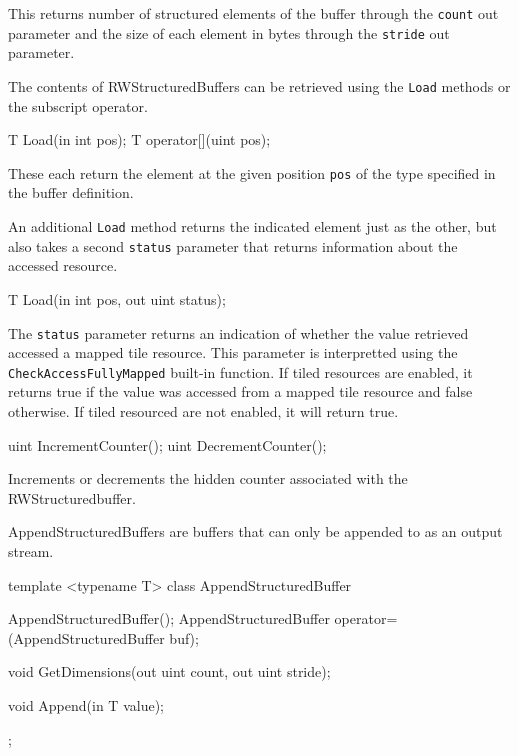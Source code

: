 This returns number of structured elements of the buffer through the \texttt{count} out parameter
and the size of each element in bytes through the \texttt{stride} out parameter.


The contents of RWStructuredBuffers can be retrieved using the \texttt{Load} methods
or the subscript operator.

\begin{HLSL}
 T Load(in int pos);
 T operator[](uint pos);
\end{HLSL}

These each return the element at the given position \texttt{pos} of the type specified in the buffer definition.

An additional \texttt{Load} method returns the indicated element just as the other,
but also takes a second \texttt{status} parameter that returns information about the accessed resource.
\begin{HLSL}
 T Load(in int pos, out uint status);
\end{HLSL}

The \texttt{status} parameter returns an indication of whether the value retrieved accessed a mapped tile
resource. This parameter is interpretted using the \texttt{CheckAccessFullyMapped}
built-in function. If tiled resources are enabled, it returns true if the value was accessed from a mapped
tile resource and false otherwise. If tiled resourced are not enabled, it will return true.


\begin{HLSL}
   uint IncrementCounter();
   uint DecrementCounter();
\end{HLSL}

Increments or decrements the hidden counter associated with the RWStructuredbuffer.


AppendStructuredBuffers are buffers that can only be appended to as an output stream.

\begin{HLSL}
template <typename T>
 class AppendStructuredBuffer {
   AppendStructuredBuffer();
   AppendStructuredBuffer operator=(AppendStructuredBuffer buf);

   void GetDimensions(out uint count, out uint stride);

   void Append(in T value);
};
\end{HLSL}

